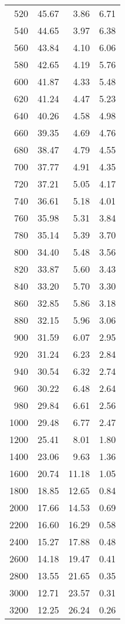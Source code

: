 \begin{table}[ht]
\begin{tabular}{rrrr}
    520 & 45.67 & 3.86 & 6.71 \\ 
    540 & 44.65 & 3.97 & 6.38 \\ 
    560 & 43.84 & 4.10 & 6.06 \\ 
    580 & 42.65 & 4.19 & 5.76 \\ 
    600 & 41.87 & 4.33 & 5.48 \\ 
    620 & 41.24 & 4.47 & 5.23 \\ 
    640 & 40.26 & 4.58 & 4.98 \\ 
    660 & 39.35 & 4.69 & 4.76 \\ 
    680 & 38.47 & 4.79 & 4.55 \\ 
    700 & 37.77 & 4.91 & 4.35 \\ 
    720 & 37.21 & 5.05 & 4.17 \\ 
    740 & 36.61 & 5.18 & 4.01 \\ 
    760 & 35.98 & 5.31 & 3.84 \\ 
    780 & 35.14 & 5.39 & 3.70 \\ 
    800 & 34.40 & 5.48 & 3.56 \\ 
    820 & 33.87 & 5.60 & 3.43 \\ 
    840 & 33.20 & 5.70 & 3.30 \\ 
    860 & 32.85 & 5.86 & 3.18 \\ 
    880 & 32.15 & 5.96 & 3.06 \\ 
    900 & 31.59 & 6.07 & 2.95 \\ 
    920 & 31.24 & 6.23 & 2.84 \\ 
    940 & 30.54 & 6.32 & 2.74 \\ 
    960 & 30.22 & 6.48 & 2.64 \\ 
    980 & 29.84 & 6.61 & 2.56 \\ 
   1000 & 29.48 & 6.77 & 2.47 \\ 
   1200 & 25.41 & 8.01 & 1.80 \\ 
   1400 & 23.06 & 9.63 & 1.36 \\ 
   1600 & 20.74 & 11.18 & 1.05 \\ 
   1800 & 18.85 & 12.65 & 0.84 \\ 
   2000 & 17.66 & 14.53 & 0.69 \\ 
   2200 & 16.60 & 16.29 & 0.58 \\ 
   2400 & 15.27 & 17.88 & 0.48 \\ 
   2600 & 14.18 & 19.47 & 0.41 \\ 
   2800 & 13.55 & 21.65 & 0.35 \\ 
   3000 & 12.71 & 23.57 & 0.31 \\ 
   3200 & 12.25 & 26.24 & 0.26 \\ 

\end{tabular}
\end{table}
